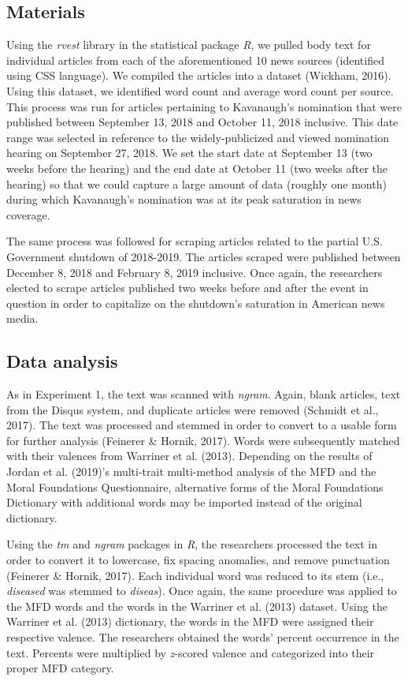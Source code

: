 \documentclass[english,,man]{apa6}
\begin{document}
\hypertarget{materials-1}{%
\subsection{Materials}\label{materials-1}}

Using the \emph{rvest} library in the statistical package \emph{R}, we pulled body text for individual articles from each of the aforementioned 10 news sources (identified using CSS language). We compiled the articles into a dataset (Wickham, 2016). Using this dataset, we identified word count and average word count per source. This process was run for articles pertaining to Kavanaugh's nomination that were published between September 13, 2018 and October 11, 2018 inclusive. This date range was selected in reference to the widely-publicized and viewed nomination hearing on September 27, 2018. We set the start date at September 13 (two weeks before the hearing) and the end date at October 11 (two weeks after the hearing) so that we could capture a large amount of data (roughly one month) during which Kavanaugh's nomination was at its peak saturation in news coverage.

The same process was followed for scraping articles related to the partial U.S. Government shutdown of 2018-2019. The articles scraped were published between December 8, 2018 and February 8, 2019 inclusive. Once again, the researchers elected to scrape articles published two weeks before and after the event in question in order to capitalize on the shutdown's saturation in American news media.

\hypertarget{data-analysis-1}{%
\subsection{Data analysis}\label{data-analysis-1}}

As in Experiment 1, the text was scanned with \emph{ngram}. Again, blank articles, text from the Disqus system, and duplicate articles were removed (Schmidt et al., 2017). The text was processed and stemmed in order to convert to a usable form for further analysis (Feinerer \& Hornik, 2017). Words were subsequently matched with their valences from Warriner et al. (2013). Depending on the results of Jordan et al. (2019)'s multi-trait multi-method analysis of the MFD and the Moral Foundations Questionnaire, alternative forms of the Moral Foundations Dictionary with additional words may be imported instead of the original dictionary.

Using the \emph{tm} and \emph{ngram} packages in \emph{R}, the researchers processed the text in order to convert it to lowercase, fix spacing anomalies, and remove punctuation (Feinerer \& Hornik, 2017). Each individual word was reduced to its stem (i.e., \emph{diseased} was stemmed to \emph{diseas}). Once again, the same procedure was applied to the MFD words and the words in the Warriner et al. (2013) dataset. Using the Warriner et al. (2013) dictionary, the words in the MFD were assigned their respective valence. The researchers obtained the words' percent occurrence in the text. Percents were multiplied by \emph{z}-scored valence and categorized into their proper MFD category.
\end{document}
